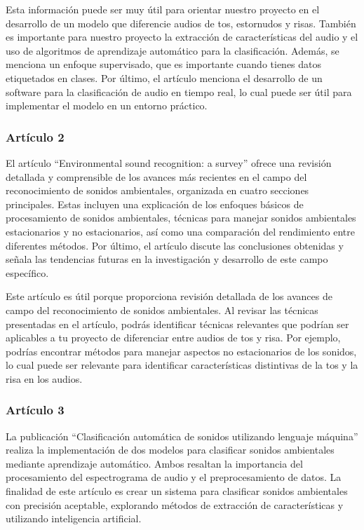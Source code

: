     Esta información puede ser muy útil para orientar nuestro proyecto en el desarrollo de un modelo que diferencie audios de tos, estornudos y risas. También es importante para nuestro proyecto la extracción de características del audio y el uso de algoritmos de aprendizaje automático para la clasificación. Además, se menciona un enfoque supervisado, que es importante cuando tienes datos etiquetados en clases. Por último, el artículo menciona el desarrollo de un software para la clasificación de audio en tiempo real, lo cual puede ser útil para implementar el modelo en un entorno práctico.
\subsubsection*{Artículo 2}
    El artículo “Environmental sound recognition: a survey”\cite{chachada2014environmental} ofrece una revisión detallada y comprensible de los avances más recientes en el campo del reconocimiento de sonidos ambientales, organizada en cuatro secciones principales. Estas incluyen una explicación de los enfoques básicos de procesamiento de sonidos ambientales, técnicas para manejar sonidos ambientales estacionarios y no estacionarios, así como una comparación del rendimiento entre diferentes métodos. Por último, el artículo discute las conclusiones obtenidas y señala las tendencias futuras en la investigación y desarrollo de este campo específico.

    Este artículo es útil porque proporciona revisión detallada de los avances de campo del reconocimiento de sonidos ambientales. Al revisar las técnicas presentadas en el artículo, podrás identificar técnicas relevantes que podrían ser aplicables a tu proyecto de diferenciar entre audios de tos y risa. Por ejemplo, podrías encontrar métodos para manejar aspectos no estacionarios de los sonidos, lo cual puede ser relevante para identificar características distintivas de la tos y la risa en los audios.
\subsubsection*{Artículo 3}
    La publicación “Clasificación automática de sonidos utilizando lenguaje máquina”\cite{rodriguez2020clasificacion} realiza la implementación de dos modelos para clasificar sonidos ambientales mediante aprendizaje automático. Ambos resaltan la importancia del procesamiento del espectrograma de audio y el preprocesamiento de datos. La finalidad de este artículo es crear un sistema para clasificar sonidos ambientales con precisión aceptable, explorando métodos de extracción de características y utilizando inteligencia artificial.

